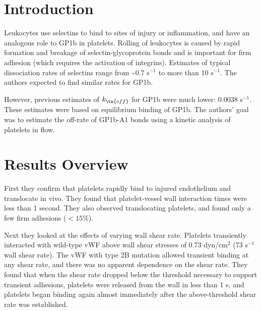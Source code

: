 \documentclass[
10pt, %
letterpaper, %
twocolumn, %
landscape %
]{article}
\begin{document}
\pagestyle{myheadings} %
\markright{\doctitle} %


\thispagestyle{plain} %

\printtitle %


\section*{Introduction} %

Leukocytes use selectins to bind to sites of injury or inflammation,
and have an analogous role to GP1b in platelets. Rolling of leukocytes
is caused by rapid formation and breakage of selectin-glycoprotein
bonds and is important for firm adhesion (which requires the
activation of integrins). Estimates of typical dissociation rates of
selectins range from \textasciitilde 0.7 s$^{-1}$ to more than 10
s$^{-1}$. The authors expected to find similar rates for GP1b. 

However, previous estimates of $k_\tn{off}$ for GP1b were much lower:
0.0038 s$^{-1}$. These estimates were based on equilibrium binding of
GP1b. The authors' goal was to estimate the off-rate of GP1b-A1 bonds
using a kinetic analysis of platelets in flow.


\section{Results Overview}

First they confirm that platelets rapidly bind to injured endothelium
and translocate in vivo. They found that platelet-vessel wall
interaction times were less than 1 second. They also observed
translocating platelets, and found only a few firm adhesions ($<
15\%$).

Next they looked at the effects of varying wall shear rate. Platelets
transiently interacted with wild-type vWF above wall shear stresses of 0.73
dyn/cm$^2$ (73 s$^{-1}$ wall shear rate). The vWF with type 2B
mutation allowed transient binding at any shear rate, and there was no
apparent dependence on the shear rate. They found that when the shear
rate dropped below the threshold necessary to support transient
adhesions, platelets were released from the wall in less than 1 s, and
platelets began binding again almost immediately after the
above-threshold shear rate was established. 
\end{document}

